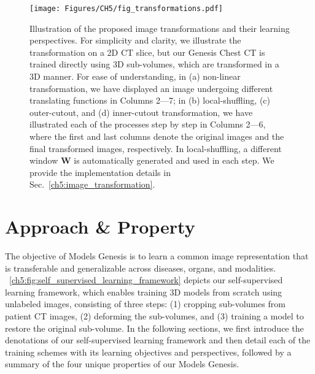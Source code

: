 \begin{figure}
\begin{center}
\texttt{[image: Figures/CH5/fig\_transformations.pdf]}
\end{center}
\caption[Illustration of Image Transformations and Learning Perspectives]{
Illustration of the proposed image transformations and their learning perspectives. For simplicity and clarity, we illustrate the transformation on a 2D CT slice, but our Genesis Chest CT is trained directly using 3D sub-volumes, which are transformed in a 3D manner. For ease of understanding, in (a) non-linear transformation, we have displayed an image undergoing different translating functions in Columns 2---7; in (b) local-shuffling, (c) outer-cutout, and (d) inner-cutout transformation, we have illustrated each of the processes step by step in Columns 2---6, where the first and last columns denote the original images and the final transformed images, respectively. In local-shuffling, a different window $\mathbf{W}$ is automatically generated and used in each step. We provide the implementation details in Sec.~\ref{ch5:image_transformation}.
}
\label{ch5:fig:image_transformations}
\end{figure}



\section{Approach \& Property}
\label{ch5:method}

The objective of Models Genesis is to learn a common image representation that is transferable and generalizable across diseases, organs, and modalities. 
\figurename~\ref{ch5:fig:self_supervised_learning_framework} depicts our self-supervised learning framework, which enables training 3D models from scratch using unlabeled images, consisting of three steps: (1) cropping sub-volumes from patient CT images, (2) deforming the sub-volumes, and (3) training a model to restore the original sub-volume. In the following sections, we first introduce the denotations of our self-supervised learning framework and then detail each of the training schemes with its learning objectives and perspectives, followed by a summary of the four unique properties of our Models Genesis.

